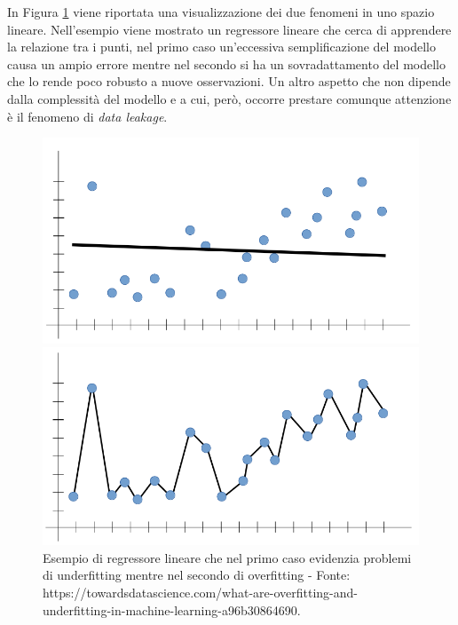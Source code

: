 \documentclass[12pt]{report}
\theoremstyle{definition}
\begin{document}
In Figura \ref{underfittingoverfitting} viene riportata una visualizzazione dei due fenomeni in uno spazio lineare. Nell'esempio viene mostrato un regressore lineare che cerca di apprendere la relazione tra i punti, nel primo caso un'eccessiva semplificazione del modello causa un ampio errore mentre nel secondo si ha un sovradattamento del modello che lo rende poco robusto a nuove osservazioni.
Un altro aspetto che non dipende dalla complessità del modello e a cui, però, occorre prestare comunque attenzione è il fenomeno di \textit{data leakage}.

\begin{figure}
\centering
    \begin{minipage}{0.48\textwidth}
        \includegraphics[width=\linewidth]{images/underfitting.png}
    \end{minipage}
    \begin{minipage}{0.48\textwidth}
        \includegraphics[width=\linewidth]{images/overfitting.png}
    \end{minipage}
    \caption{Esempio di regressore lineare che nel primo caso evidenzia problemi di underfitting mentre nel secondo di overfitting - Fonte: https://towardsdatascience.com/what-are-overfitting-and-underfitting-in-machine-learning-a96b30864690.}
    \label{underfittingoverfitting}
\end{figure} 
\end{document}
